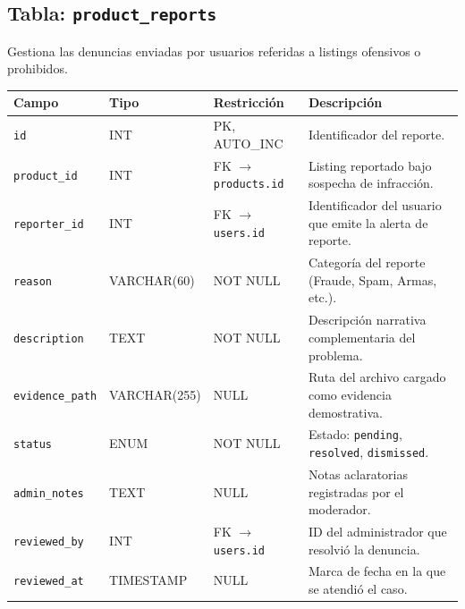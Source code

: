 \documentclass[11pt,a4paper]{report}
\begin{document}
\subsection{Tabla: \texttt{product\_reports}}
Gestiona las denuncias enviadas por usuarios referidas a listings ofensivos o prohibidos.
\begin{table}[H]
\centering
\begin{tabularx}{\textwidth}{|l|l|l|L|}
\hline
{}\textbf{Campo} & \textbf{Tipo} & \textbf{Restricción} & \textbf{Descripción} \\ \hline
\texttt{id} & INT & PK, AUTO\_INC & Identificador del reporte. \\ \hline
\texttt{product\_id} & INT & FK $\rightarrow$ \texttt{products.id} & Listing reportado bajo sospecha de infracción. \\ \hline
\texttt{reporter\_id} & INT & FK $\rightarrow$ \texttt{users.id} & Identificador del usuario que emite la alerta de reporte. \\ \hline
\texttt{reason} & VARCHAR(60) & NOT NULL & Categoría del reporte (Fraude, Spam, Armas, etc.). \\ \hline
\texttt{description} & TEXT & NOT NULL & Descripción narrativa complementaria del problema. \\ \hline
\texttt{evidence\_path} & VARCHAR(255) & NULL & Ruta del archivo cargado como evidencia demostrativa. \\ \hline
\texttt{status} & ENUM & NOT NULL & Estado: \texttt{pending}, \texttt{resolved}, \texttt{dismissed}. \\ \hline
\texttt{admin\_notes} & TEXT & NULL & Notas aclaratorias registradas por el moderador. \\ \hline
\texttt{reviewed\_by} & INT & FK $\rightarrow$ \texttt{users.id} & ID del administrador que resolvió la denuncia. \\ \hline
\texttt{reviewed\_at} & TIMESTAMP & NULL & Marca de fecha en la que se atendió el caso. \\ \hline
\end{tabularx}
\end{table}
\end{document}
